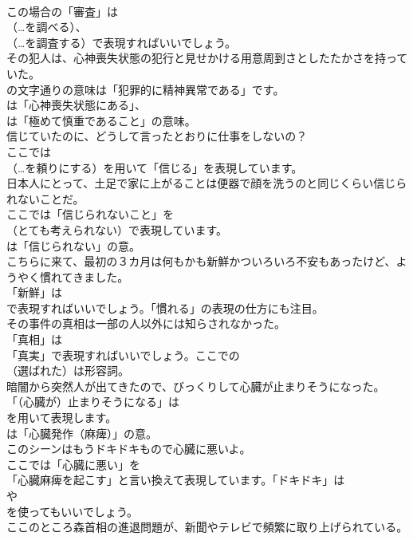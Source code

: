 \documentclass[8pt]{extreport}
\begin{document}
\begin{CJK}{UTF8}{min}
\\	この場合の「審査」は 
\\	（…を調べる）、
\\	（…を調査する）で表現すればいいでしょう。	
\\	その犯人は、心神喪失状態の犯行と見せかける用意周到さとしたたかさを持っていた。 
\\	の文字通りの意味は「犯罪的に精神異常である」です。
\\	は「心神喪失状態にある」、
\\	は「極めて慎重であること」の意味。	
\\	信じていたのに、どうして言ったとおりに仕事をしないの？ 
\\	ここでは 
\\	（…を頼りにする）を用いて「信じる」を表現しています。	
\\	日本人にとって、土足で家に上がることは便器で顔を洗うのと同じくらい信じられないことだ。 
\\	ここでは「信じられないこと」を 
\\	（とても考えられない）で表現しています。
\\	は「信じられない」の意。	
\\	こちらに来て、最初の３カ月は何もかも新鮮かついろいろ不安もあったけど、ようやく慣れてきました。 
\\	「新鮮」は 
\\	で表現すればいいでしょう。「慣れる」の表現の仕方にも注目。	
\\	その事件の真相は一部の人以外には知らされなかった。 
\\	「真相」は
\\	「真実」で表現すればいいでしょう。ここでの
\\	（選ばれた）は形容詞。	
\\	暗闇から突然人が出てきたので、びっくりして心臓が止まりそうになった。 
\\	「（心臓が）止まりそうになる」は 
\\	を用いて表現します。
\\	は「心臓発作（麻痺）」の意。	
\\	このシーンはもうドキドキもので心臓に悪いよ。 
\\	ここでは「心臓に悪い」を
\\	「心臓麻痺を起こす」と言い換えて表現しています。「ドキドキ」は
\\	や
\\	を使ってもいいでしょう。	
\\	ここのところ森首相の進退問題が、新聞やテレビで頻繁に取り上げられている。 

\end{CJK}
\end{document}
